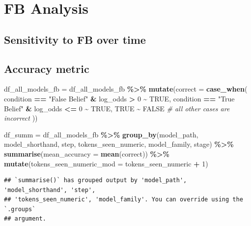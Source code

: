 \documentclass[
]{article}
\newenvironment{Shaded}{\begin{snugshade}}{\end{snugshade}}
\newcommand{\AttributeTok}[1]{\textcolor[rgb]{0.13,0.29,0.53}{#1}}
\newcommand{\CommentTok}[1]{\textcolor[rgb]{0.56,0.35,0.01}{\textit{#1}}}
\newcommand{\ConstantTok}[1]{\textcolor[rgb]{0.56,0.35,0.01}{#1}}
\newcommand{\DecValTok}[1]{\textcolor[rgb]{0.00,0.00,0.81}{#1}}
\newcommand{\FunctionTok}[1]{\textcolor[rgb]{0.13,0.29,0.53}{\textbf{#1}}}
\newcommand{\NormalTok}[1]{#1}
\newcommand{\OtherTok}[1]{\textcolor[rgb]{0.56,0.35,0.01}{#1}}
\newcommand{\SpecialCharTok}[1]{\textcolor[rgb]{0.81,0.36,0.00}{\textbf{#1}}}
\newcommand{\StringTok}[1]{\textcolor[rgb]{0.31,0.60,0.02}{#1}}
\begin{document}
\hypertarget{fb-analysis}{%
\section{FB Analysis}\label{fb-analysis}}

\hypertarget{sensitivity-to-fb-over-time}{%
\subsection{Sensitivity to FB over
time}\label{sensitivity-to-fb-over-time}}

\hypertarget{accuracy-metric}{%
\subsection{Accuracy metric}\label{accuracy-metric}}

\begin{Shaded}
\begin{Highlighting}[]
\NormalTok{df\_all\_models\_fb }\OtherTok{=}\NormalTok{ df\_all\_models\_fb }\SpecialCharTok{\%\textgreater{}\%}
  \FunctionTok{mutate}\NormalTok{(}\AttributeTok{correct =} \FunctionTok{case\_when}\NormalTok{(}
\NormalTok{    condition }\SpecialCharTok{==} \StringTok{"False Belief"} \SpecialCharTok{\&}\NormalTok{ log\_odds }\SpecialCharTok{\textgreater{}} \DecValTok{0} \SpecialCharTok{\textasciitilde{}} \ConstantTok{TRUE}\NormalTok{,}
\NormalTok{    condition }\SpecialCharTok{==} \StringTok{"True Belief"} \SpecialCharTok{\&}\NormalTok{ log\_odds }\SpecialCharTok{\textless{}=} \DecValTok{0} \SpecialCharTok{\textasciitilde{}} \ConstantTok{TRUE}\NormalTok{,}
    \ConstantTok{TRUE} \SpecialCharTok{\textasciitilde{}} \ConstantTok{FALSE}  \CommentTok{\# all other cases are incorrect}
\NormalTok{  ))}

\NormalTok{df\_summ }\OtherTok{=}\NormalTok{ df\_all\_models\_fb }\SpecialCharTok{\%\textgreater{}\%}
  \FunctionTok{group\_by}\NormalTok{(model\_path, model\_shorthand,}
\NormalTok{           step, tokens\_seen\_numeric, model\_family, stage) }\SpecialCharTok{\%\textgreater{}\%}
  \FunctionTok{summarise}\NormalTok{(}\AttributeTok{mean\_accuracy =} \FunctionTok{mean}\NormalTok{(correct)) }\SpecialCharTok{\%\textgreater{}\%}
  \FunctionTok{mutate}\NormalTok{(}\AttributeTok{tokens\_seen\_numeric\_mod =}\NormalTok{ tokens\_seen\_numeric }\SpecialCharTok{+} \DecValTok{1}\NormalTok{)}
\end{Highlighting}
\end{Shaded}

\begin{verbatim}
## `summarise()` has grouped output by 'model_path', 'model_shorthand', 'step',
## 'tokens_seen_numeric', 'model_family'. You can override using the `.groups`
## argument.
\end{verbatim}
\end{document}

